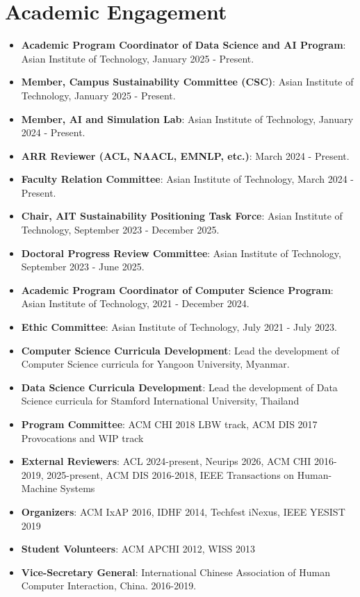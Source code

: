 \documentclass[letterpaper,11pt]{article}
\newcommand{\resumeItem}[2]{
  \item\small{
    \textbf{#1}{: #2 \vspace{-2pt}}
  }
}
\newcommand{\resumeSubItem}[2]{\resumeItem{#1}{#2}\vspace{-4pt}}
\newcommand{\resumeSubHeadingListStart}{\begin{itemize}[leftmargin=*]}
\newcommand{\resumeSubHeadingListEnd}{\end{itemize}}
\begin{document}
\section{Academic Engagement}
\resumeSubHeadingListStart
\resumeSubItem{Academic Program Coordinator of Data Science and AI Program}
{Asian Institute of Technology, January 2025 - Present.}
\resumeSubItem{Member, Campus Sustainability Committee (CSC)}
{Asian Institute of Technology, January 2025 - Present.}
\resumeSubItem{Member, AI and Simulation Lab}
{Asian Institute of Technology, January 2024 - Present.}
\resumeSubItem{ARR Reviewer (ACL, NAACL, EMNLP, etc.)}
{March 2024 - Present.}
\resumeSubItem{Faculty Relation Committee}
{Asian Institute of Technology, March 2024 - Present.}
\resumeSubItem{Chair, AIT Sustainability Positioning Task Force}
{Asian Institute of Technology, September 2023 - December 2025.}
\resumeSubItem{Doctoral Progress Review Committee}
{Asian Institute of Technology, September 2023 - June 2025.}
\resumeSubItem{Academic Program Coordinator of Computer Science Program}
{Asian Institute of Technology, 2021 - December 2024.}
\resumeSubItem{Ethic Committee}
{Asian Institute of Technology, July 2021 - July 2023.}
\resumeSubItem{Computer Science Curricula Development}
{Lead the development of Computer Science curricula for Yangoon University, Myanmar.}
\resumeSubItem{Data Science Curricula Development}
{Lead the development of Data Science curricula for Stamford International University, Thailand}
\resumeSubItem{Program Committee}{ACM CHI 2018 LBW track, ACM DIS 2017 Provocations and WIP track}
\resumeSubItem{External Reviewers}{ACL 2024-present, Neurips 2026, ACM CHI 2016-2019, 2025-present, ACM DIS 2016-2018, IEEE Transactions on Human-Machine Systems}
\resumeSubItem{Organizers}{ACM IxAP 2016, IDHF 2014, Techfest iNexus, IEEE YESIST 2019}
\resumeSubItem{Student Volunteers}{ACM APCHI 2012, WISS 2013}
\resumeSubItem{Vice-Secretary General}{International Chinese Association of Human Computer Interaction, China. 2016-2019.}

\resumeSubHeadingListEnd
\end{document}
